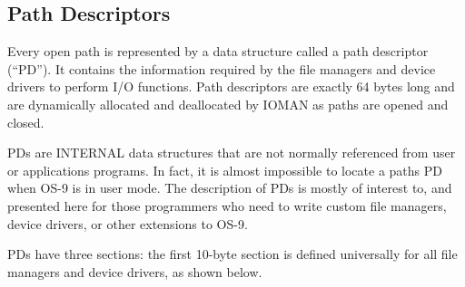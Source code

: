 \documentclass[
]{article}
\begin{document}
\subsection{Path Descriptors}

Every open path is represented by a data structure called a path
descriptor (``PD''). It contains the information required by the file
managers and device drivers to perform I/O functions. Path descriptors
are exactly 64 bytes long and are dynamically allocated and deallocated
by IOMAN as paths are opened and closed.

PDs are INTERNAL data structures that are not normally referenced from
user or applications programs. In fact, it is almost impossible to
locate a path\textquotesingle s PD when OS-9 is in user mode. The
description of PDs is mostly of interest to, and presented here for
those programmers who need to write custom file managers, device
drivers, or other extensions to OS-9.

PDs have three sections: the first 10-byte section is defined
universally for all file managers and device drivers, as shown below.
\end{document}
